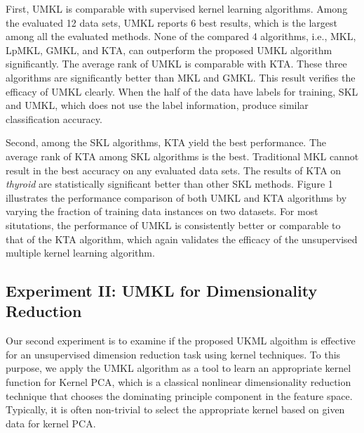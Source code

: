 First, UMKL is comparable with supervised kernel learning algorithms. Among the evaluated 12 data sets, UMKL reports 6 best results, which is the largest among all the evaluated methods. None of the compared 4 algorithms, i.e., MKL, LpMKL, GMKL, and KTA, can outperform the proposed UMKL algorithm significantly. The average rank of UMKL is comparable with KTA. These three algorithms are significantly better than MKL and GMKL. This result verifies the efficacy of UMKL clearly. When the half of the data have labels for training, SKL and UMKL, which does not use the label information, produce similar classification accuracy.

Second, among the SKL algorithms, KTA yield the best performance. The average rank of KTA among SKL algorithms is the best. Traditional MKL cannot result in the best accuracy on any evaluated data sets. The results of KTA on {\em thyroid} are statistically significant better than other SKL methods. Figure 1 illustrates the performance comparison of both UMKL and KTA algorithms by varying the fraction of training data instances on two datasets. For most situtations, the performance of UMKL is consistently better or comparable to that of the KTA algorithm, which again validates the efficacy of the unsupervised multiple kernel learning algorithm.


\subsection{Experiment II: UMKL for Dimensionality Reduction}

Our second experiment is to examine if the proposed UKML algoithm is effective for an unsupervised dimension reduction task using kernel techniques. To this purpose, we apply the UMKL algorithm as a tool to learn an appropriate kernel function for Kernel PCA, which is a classical nonlinear dimensionality reduction technique that chooses the dominating principle component in the feature space. Typically, it is often non-trivial to select the appropriate kernel based on given data for kernel PCA.

